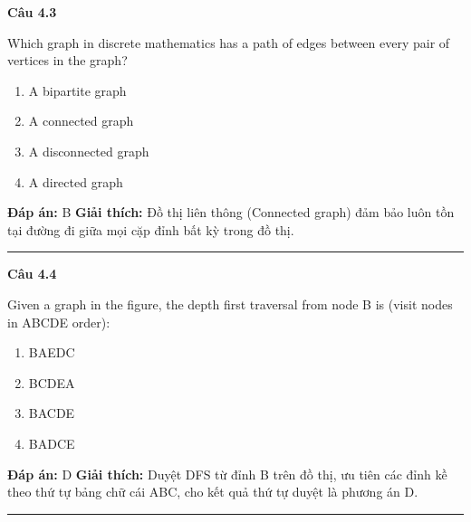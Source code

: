 \documentclass[11pt,a4paper]{article}
\newenvironment{question}[1]{%
  \par\vspace{1em}\noindent\textbf{\large Câu #1}\par\vspace{0.4em}
}{%
  \par\vspace{1em}\hrule\vspace{0.6em}
}
\newenvironment{choices}{%
  \begin{enumerate}[label=\textbf{\Alph*.},leftmargin=2.2em,itemsep=2pt,topsep=3pt]
}{%
  \end{enumerate}
}
\newcommand{\choice}{\item}
\begin{document}
\begin{question}{4.3}
Which graph in discrete mathematics has a path of edges between every pair of vertices in the graph?
\begin{choices}
\choice A bipartite graph
\choice A connected graph
\choice A disconnected graph
\choice A directed graph
\end{choices}
\textbf{Đáp án:} B
\textbf{Giải thích:} Đồ thị liên thông (Connected graph) đảm bảo luôn tồn tại đường đi giữa mọi cặp đỉnh bất kỳ trong đồ thị.
\end{question}

\begin{question}{4.4}
Given a graph in the figure, the depth first traversal from node B is (visit nodes in ABCDE order):
\begin{center}
\end{center}
\begin{choices}
\choice BAEDC
\choice BCDEA
\choice BACDE
\choice BADCE
\end{choices}
\textbf{Đáp án:} D
\textbf{Giải thích:} Duyệt DFS từ đỉnh B trên đồ thị, ưu tiên các đỉnh kề theo thứ tự bảng chữ cái ABC, cho kết quả thứ tự duyệt là phương án D.
\end{question}
\end{document}
